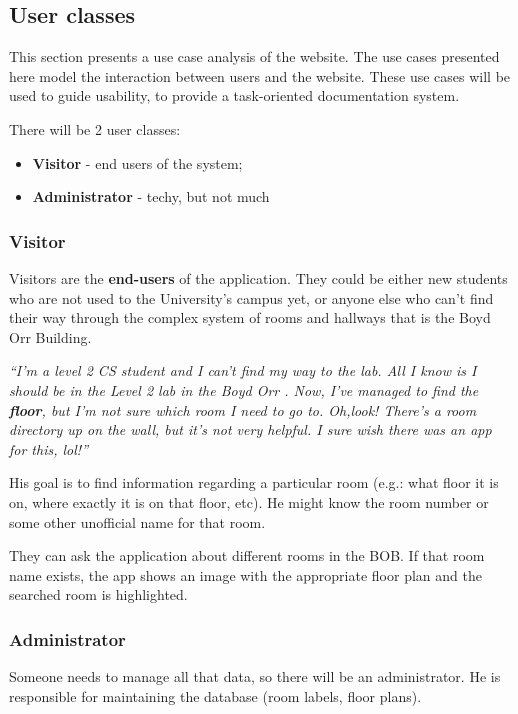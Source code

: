 \documentclass{sig-alt-release2}
\begin{document}
\subsection*{User classes}
This section presents a use case analysis of the website. The use cases 
presented here model the interaction between users and the website. These use 
cases will be used to guide usability, to provide a task-oriented 
documentation system.

There will be 2 user classes:
\begin{itemize}
	\item \textbf{Visitor} - end users of the system;
	\item \textbf{Administrator} - techy, but not much
\end{itemize}

\subsubsection*{Visitor}
Visitors are the \textbf{end-users} of the application. They could be either
new students who are not used to the University's campus yet, or anyone else
who can't find their way through the complex system of rooms and hallways that
is the Boyd Orr Building.

\emph{``I'm a level 2 CS student and I can't find my way to the lab. All 
I know is I should be in the \guillemotleft Level 2 lab in the Boyd Orr
\guillemotright. Now, I've managed to find the \textbf{floor}, but I'm not sure
which room I need to go to. Oh,look! There's a room directory up on the wall, 
but it's not very helpful. I sure wish there was an app for this, lol!''}

His goal is to find information regarding a particular room (e.g.: what floor 
it is on, where exactly it is on that floor, etc). He might know the room 
number or some other unofficial name for that room.

They can ask the application about different rooms in the BOB. If that room 
name exists, the app shows an image with the appropriate floor plan and the 
searched room is highlighted.

\subsubsection*{Administrator}
Someone needs to manage all that data, so there will be an administrator. He is
responsible for maintaining the database (room labels, floor plans).
\end{document}

